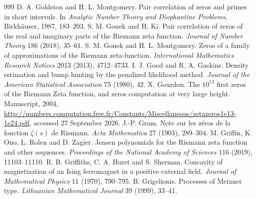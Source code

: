 \begin{thebibliography}{999}
 D. A. Goldston and H. L. Montgomery. Pair correlation of zeros and primes in short intervals. In \emph{Analytic Number Theory and Diophantine Problems}, Birkh\"auser, 1987, 183--203.
 S. M. Gonek and H. Ki. Pair correlation of zeros of the real and imaginary parts of the Riemann zeta function. \emph{Journal of Number Theory} 186 (2018), 35--61.
 S. M. Gonek and H. L. Montgomery. Zeros of a family of approximations of the Riemann zeta-function. \emph{International Mathematics Research Notices} 2013 (2013), 4712--4733.
 I. J. Good and R. A. Gaskins. Density estimation and bump hunting by the penalized likelihood method. \emph{Journal of the American Statistical Association} 75 (1980), 42.
 X. Gourdon. The $10^{13}$ first zeros of the Riemann Zeta function, and zeros computation at very large height. Manuscript, 2004, \url{http://numbers.computation.free.fr/Constants/Miscellaneous/zetazeros1e13-1e24.pdf}, accessed 27 September 2026.
 J.-P. Gram. Note sur les z\'eros de la fonction $\zeta(s)$ de Riemann. \emph{Acta Mathematica} 27 (1903), 289--304.
 M. Griffin, K. Ono, L. Rolen and D. Zagier. Jensen polynomials for the Riemann zeta function and other sequences. \emph{Proceedings of the National Academy of Sciences} 116 (2019), 11103--11110.
 R. B. Griffiths, C. A. Hurst and S. Sherman. Concavity of magnetization of an Ising ferromagnet in a positive external field. \emph{Journal of Mathematical Physics} 11 (1970), 790--795.
 B. Grigelionis. Processes of Meixner type. \emph{Lithuanian Mathematical Journal} 39 (1999), 33--41.

\end{thebibliography}
